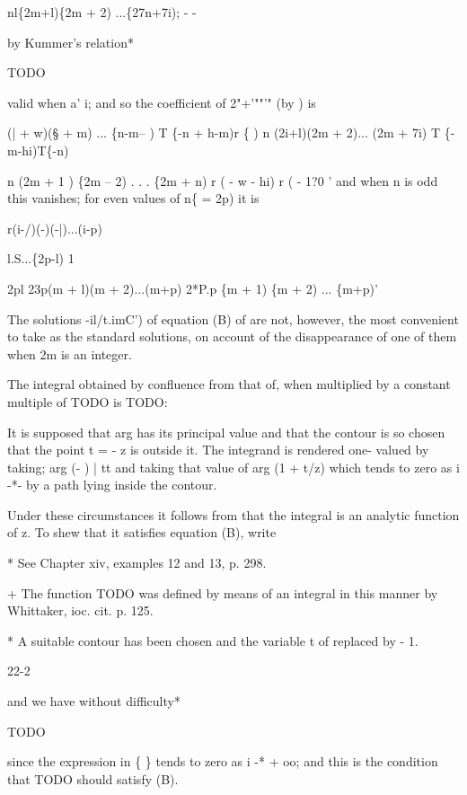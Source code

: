 nl\{2m+l)\{2m + 2) ...\{27n+7i); - -

by Kummer's relation*

TODO

valid when a' i; and so the coefficient of 2"+'""'" (by 
) is

(| + w)(§ + m) ... \{n-m-- ) T \{-n + h-m)r \{ ) n (2i+l)(2m +
2)... (2m + 7i) T \{-m-hi)T\{-n)

n (2m + 1 ) \{2m -- 2) . . . \{2m + n) r ( - w - hi) r ( - 1?0 '
and when n is odd this vanishes; for even values of n\{ = 2p) it is

r(i-/)(-)(-|)...(i-p)

l.S...\{2p-l) 1

2pl 23p(m + l)(m + 2)...(m+p) 2*P.p \{m + 1) \{m + 2) ... \{m+p)'


The solutions -il/t.imC') of equation (B) of are not,
however, the most convenient to take as the standard solutions, on
account of the disappearance of one of them when 2m is an integer.

The integral obtained by confluence from that of, when
multiplied by a constant multiple of TODO is TODO:

It is supposed that arg has its principal value and that the contour
is so chosen that the point t = - z is outside it. The integrand is
rendered one- valued by taking; arg (- ) |  tt and taking that
value of arg (1 + t/z) which tends to zero as i -*- by a path lying
inside the contour.

Under these circumstances it follows from that the integral is
an analytic function of z. To shew that it satisfies equation (B),
write

* See Chapter xiv, examples 12 and 13, p. 298.

+ The function TODO was defined by means of an integral in this manner
by Whittaker, ioc. cit. p. 125.

* A suitable contour has been chosen and the variable t of
replaced by - 1.

22-2

%
%

and we have without difficulty*

TODO

since the expression in \{ \} tends to zero as i -* + oo; and this is
the condition that TODO should satisfy (B).

